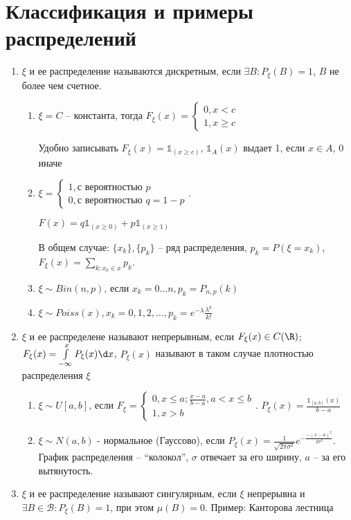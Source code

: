 \section{Классификация и примеры распределений}
\begin{enumerate}[label=\Roman*.]
    \item $\xi$ и ее распределение называются дискретным, если $\exists B\colon P_{\xi}(B) = 1$, $B$ не более чем счетное.
    \begin{enumerate}[label=\arabic*.]
    \item $\xi = C$ -- константа, тогда $F_{\xi}(x) = \begin{cases} 0, x < c \\ 1, x \geq c\end{cases}$
    \begin{Rem}
        Удобно записывать $F_{\xi}(x) = \mathbb{1}_(x \geq c)$, $\mathbb{1}_A (x)$ выдает 1, если $x \in A$, 0 иначе
    \end{Rem}   
    \item $\xi = \begin{cases} 1, \text{с вероятностью } p \\ 0, \text{с вероятностью } q = 1 - p\end{cases}$.

    $F(x) = q \mathbb{1}_{(x \geq 0)} + p \mathbb{1}_{(x \geq 1)}$

    В общем случае: $\{x_k\}, \{p_k\}$ -- ряд распределения, $p_k = P(\xi = x_k)$, $F_{\xi}(x) = \sum\limits_{k\colon x_k \in x} p_k$.

    \item
    $\xi \sim Bin(n, p)$, если $x_k = 0 \dots n, p_k = P_{n,p}(k)$

    \item
    $\xi \sim Poiss(x), x_k = 0, 1, 2, \dots, p_k = e^{-\lambda} \frac{\lambda^k}{k!}$
    \end{enumerate}
    \item $\xi$ и ее распределене называют непрерывным, если $F_{\xi}(x) \in C(\R)$; $F_{\xi}(x) =\int\limits_{-\infty}^{x} P_{\xi}(x) \d x$, $P_{\xi}(x)$ называют в таком случае плотностью распределения $\xi$
    \begin{enumerate}[label=\arabic*.]
    \item $\xi \sim U[a, b]$, если $F_{\xi} = \begin{cases} 0, x \leq a; \frac{x - a}{b - a}, a < x \leq b \\ 1, x > b\end{cases}$. 
        $P_{\xi}(x) = \frac{\mathbb{1}_{[a, b]}(x)}{b - a}$

    \item $\xi \sim N(a, b)$ - нормальное (Гауссово), если $P_{\xi}(x)= \frac{1}{\sqrt{2 \pi \sigma^2}} e^{-\frac{-(x-a)^2}{2\sigma^2}}$.
    График распределения -- ``колокол'', $\sigma$ отвечает за его ширину, $a$ -- за его вытянутость.

    \end{enumerate}
    
    \item $\xi$ и ее распределение называют сингулярным, если $\xi$ непрерывна и $\exists B \in \mathcal{B}\colon P_{\xi}(B) = 1$, при этом $\mu(B) = 0$.
    Пример: Канторова лестница
\end{enumerate}